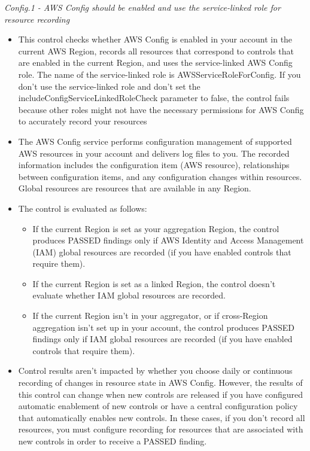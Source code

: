 \begin{mdframed}[backgroundcolor=gray!05, linecolor=gray!50]
\itshape
Config.1 - AWS Config should be enabled and use the service-linked role for resource recording
\begin{itemize}
    \item This control checks whether AWS Config is enabled in your account in the current AWS Region, records all resources that correspond to controls that are enabled in the current Region, and uses the service-linked AWS Config role. The name of the service-linked role is AWSServiceRoleForConfig. If you don't use the service-linked role and don't set the includeConfigServiceLinkedRoleCheck parameter to false, the control fails because other roles might not have the necessary permissions for AWS Config to accurately record your resources
    \item The AWS Config service performs configuration management of supported AWS resources in your account and delivers log files to you. The recorded information includes the configuration item (AWS resource), relationships between configuration items, and any configuration changes within resources. Global resources are resources that are available in any Region.
    \item The control is evaluated as follows:
    \begin{itemize}
        \item If the current Region is set as your aggregation Region, the control produces PASSED findings only if AWS Identity and Access Management (IAM) global resources are recorded (if you have enabled controls that require them).
        \item If the current Region is set as a linked Region, the control doesn't evaluate whether IAM global resources are recorded.
        \item If the current Region isn't in your aggregator, or if cross-Region aggregation isn't set up in your account, the control produces PASSED findings only if IAM global resources are recorded (if you have enabled controls that require them).
    \end{itemize}
    \item Control results aren't impacted by whether you choose daily or continuous recording of changes in resource state in AWS Config. However, the results of this control can change when new controls are released if you have configured automatic enablement of new controls or have a central configuration policy that automatically enables new controls. In these cases, if you don't record all resources, you must configure recording for resources that are associated with new controls in order to receive a PASSED finding.
\end{itemize}
\end{mdframed}

